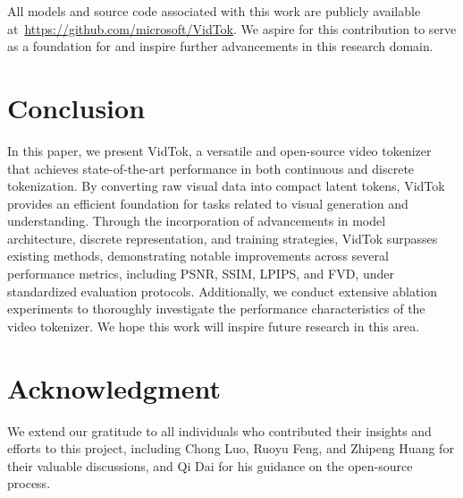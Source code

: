 \documentclass{article} %
\begin{document}
All models and source code associated with this work are publicly available at~\url{https://github.com/microsoft/VidTok}. We aspire for this contribution to serve as a foundation for and inspire further advancements in this research domain.

\section{Conclusion}
\label{sec:conclusion}

In this paper, we present VidTok, a versatile and open-source video tokenizer that achieves state-of-the-art performance in both continuous and discrete tokenization. By converting raw visual data into compact latent tokens, VidTok provides an efficient foundation for tasks related to visual generation and understanding. Through the incorporation of advancements in model architecture, discrete representation, and training strategies, VidTok surpasses existing methods, demonstrating notable improvements across several performance metrics, including PSNR, SSIM, LPIPS, and FVD, under standardized evaluation protocols. Additionally, we conduct extensive ablation experiments to thoroughly investigate the performance characteristics of the video tokenizer. We hope this work will inspire future research in this area.

\section*{Acknowledgment}

We extend our gratitude to all individuals who contributed their insights and efforts to this project, including Chong Luo, Ruoyu Feng, and Zhipeng Huang for their valuable discussions, and Qi Dai for his guidance on the open-source process.



\end{document}
